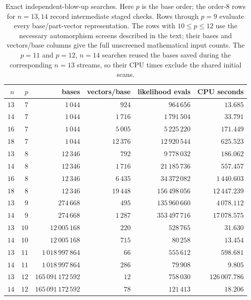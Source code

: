 \documentclass[11pt]{article}
\theoremstyle{definition}
\begin{document}
\begin{table}[htbp]
\centering
\small
\begin{tabular}{@{}rrrrrr@{}}
\toprule
$n$ & $p$ & bases & vectors/base & likelihood evals & CPU seconds\\
\midrule
$13$ & $7$ & $1\,044$ & $924$ & $964\,656$ & $13.685$\\
$14$ & $7$ & $1\,044$ & $1\,716$ & $1\,791\,504$ & $33.791$\\
$16$ & $7$ & $1\,044$ & $5\,005$ & $5\,225\,220$ & $171.449$\\
$18$ & $7$ & $1\,044$ & $12\,376$ & $12\,920\,544$ & $625.523$\\
$13$ & $8$ & $12\,346$ & $792$ & $9\,778\,032$ & $186.062$\\
$14$ & $8$ & $12\,346$ & $1\,716$ & $21\,185\,736$ & $557.457$\\
$16$ & $8$ & $12\,346$ & $6\,435$ & $34\,372\,082$ & $1\,440.603$\\
$18$ & $8$ & $12\,346$ & $19\,448$ & $156\,498\,056$ & $12\,447.239$\\
$13$ & $9$ & $274\,668$ & $495$ & $135\,960\,660$ & $4\,078.112$\\
$14$ & $9$ & $274\,668$ & $1\,287$ & $353\,497\,716$ & $17\,078.575$\\
$13$ & $10$ & $12\,005\,168$ & $220$ & $528\,765$ & $31.630$\\
$14$ & $10$ & $12\,005\,168$ & $715$ & $80\,258$ & $13.454$\\
$13$ & $11$ & $1\,018\,997\,864$ & $66$ & $555\,612$ & $598.681$\\
$14$ & $11$ & $1\,018\,997\,864$ & $286$ & $79\,908$ & $9.805$\\
$13$ & $12$ & $165\,091\,172\,592$ & $12$ & $758\,030$ & $126\,007.786$\\
$14$ & $12$ & $165\,091\,172\,592$ & $78$ & $121\,413$ & $18.206$\\
\bottomrule
\end{tabular}
\caption{Exact independent-blow-up searches.  Here $p$ is the base order;
the order-$8$ rows for $n=13,14$ record intermediate staged checks.  Rows through $p=9$
evaluate every base/part-vector representation.  The rows with
$10\le p\le12$ use the necessary automorphism screens described in the text;
their bases and vectors/base columns give the full unscreened mathematical
input counts.  The $p=11$ and $p=12$,
$n=14$ searches reused the bases saved during the corresponding $n=13$
streams, so their CPU times exclude the shared initial scans.}
\label{tab:blowupsearch}
\end{table}
\end{document}
